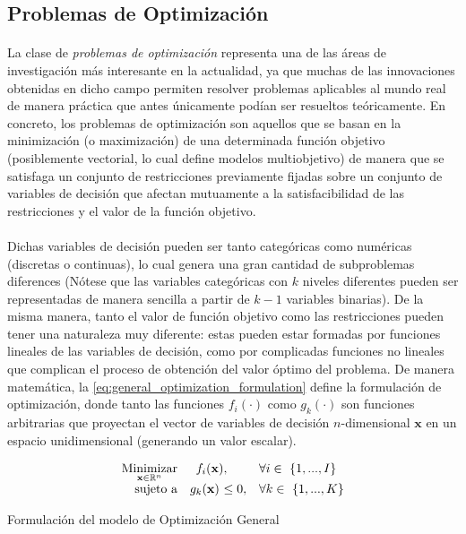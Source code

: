 \documentclass{subfiles}
\begin{document}
      \subsection{Problemas de Optimización}
      \label{sec:formulation_optimization_problems}

        \paragraph{}
        La clase de \emph{problemas de optimización} representa una de las áreas de investigación más interesante en la actualidad, ya que muchas de las innovaciones obtenidas en dicho campo permiten resolver problemas aplicables al mundo real de manera práctica que antes únicamente podían ser resueltos teóricamente. En concreto, los problemas de optimización son aquellos que se basan en la minimización (o maximización) de una determinada función objetivo (posiblemente vectorial, lo cual define modelos multiobjetivo) de manera que se satisfaga un conjunto de restricciones previamente fijadas sobre un conjunto de variables de decisión que afectan mutuamente a la satisfacibilidad de las restricciones y el valor de la función objetivo.

        \paragraph{}
        Dichas variables de decisión pueden ser tanto categóricas como numéricas (discretas o continuas), lo cual genera una gran cantidad de subproblemas diferences (Nótese que las variables categóricas con $k$ niveles diferentes pueden ser representadas de manera sencilla a partir de $k-1$ variables binarias). De la misma manera, tanto el valor de función objetivo como las restricciones pueden tener una naturaleza muy diferente: estas pueden estar formadas por funciones lineales de las variables de decisión, como por complicadas funciones no lineales que complican el proceso de obtención del valor óptimo del problema. De manera matemática, la \cref{eq:general_optimization_formulation} define la formulación de optimización, donde tanto las funciones $f_i(\cdot)$ como $g_k(\cdot)$ son funciones arbitrarias que proyectan el vector de variables de decisión $n$-dimensional $\mathbf{x}$ en un espacio unidimensional (generando un valor escalar).

        \begin{eqfloat}
          \begin{equation}
            \begin{array}{rr@{}ll}
              \underset{\mathbf{x} \in \mathbb{R}^{n}}{\text{Minimizar}} & f_i(\mathbf{x}) &                 ,& \forall i \in \{1,...,I\} \\
              \text{sujeto a}	 & g_k(\mathbf{x}) \ &\leq 0, & \forall k \in \{1,...,K\}
            \end{array}
          \end{equation}
          \caption{Formulación del modelo de Optimización General}
          \label{eq:general_optimization_formulation}
        \end{eqfloat}
\end{document}
